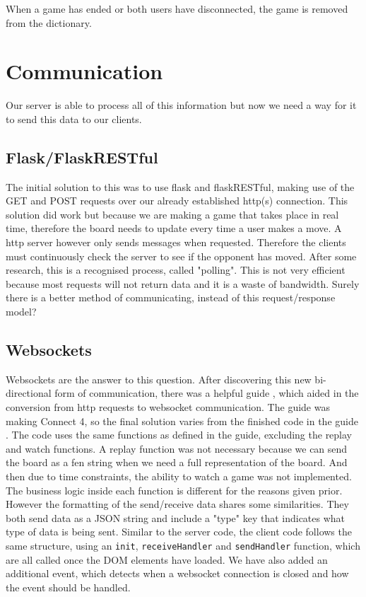 When a game has ended or both users have disconnected, the game is removed from the dictionary.

\section{Communication}


Our server is able to process all of this information but now we need a way for it to send this data to our clients.

\subsection{Flask/FlaskRESTful}

The initial solution to this was to use flask and flaskRESTful, making use of the GET and POST requests over our already established http(s) connection. This solution did work but because we are making a game that takes place in real time, therefore the board needs to update every time a user makes a move. A http server however only sends messages when requested. Therefore the clients must continuously check the server to see if the opponent has moved. After some research, this is a recognised process, called "polling". This is not very efficient because most requests will not return data and it is a waste of bandwidth. Surely there is a better method of communicating, instead of this request/response model?

\subsection{Websockets}
\label{Websockets}

Websockets are the answer to this question. After discovering this new bi-directional form of communication, there was a helpful guide \cite{Websockets}, which aided in the conversion from http requests to websocket communication. The guide was making Connect 4, so the final solution varies from the finished code in the guide \cite{CompleteCode}. The code uses the same functions as defined in the guide, excluding the replay and watch functions. A replay function was not necessary because we can send the board as a fen string when we need a full representation of the board. And then due to time constraints, the ability to watch a game was not implemented. The business logic inside each function is different for the reasons given prior. However the formatting of the send/receive data shares some similarities. They both send data as a JSON string and include a "type" key that indicates what type of data is being sent. Similar to the server code, the client code follows the same structure, using an \lstinline{init}, \lstinline{receiveHandler} and \lstinline{sendHandler} function, which are all called once the DOM elements have loaded. We have also added an additional event, which detects when a websocket connection is closed and how the event should be handled.

